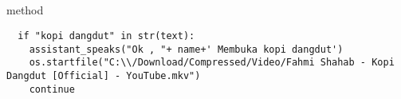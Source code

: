 \\
\\
\\
\\
\\
\\
\\
\\
\\
\\
\\
\\
\\
\\
\\
\\
\\
\\
\\
 method 
\begin{lstlisting}
  if "kopi dangdut" in str(text):
    assistant_speaks("Ok , "+ name+' Membuka kopi dangdut')
    os.startfile("C:\\/Download/Compressed/Video/Fahmi Shahab - Kopi Dangdut [Official] - YouTube.mkv")
    continue
\end{lstlisting}
\\
\\
\\
\\
\\
\\
\\
\\
\\
\\
\\
\\
\\
\\
\\
\\
\\
\\
\\
\\
\\
\\
\\
\\
\\
\\
\\
\\
\\
\\
\\
\\
\\
